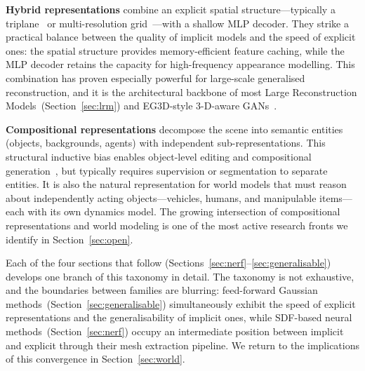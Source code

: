 \textbf{Hybrid representations} combine an explicit spatial structure---typically
a triplane~\citep{chan2022efficient} or multi-resolution
grid~\citep{muller2022instant}---with a shallow MLP decoder.
They strike a practical balance between the quality of implicit models and
the speed of explicit ones: the spatial structure provides memory-efficient
feature caching, while the MLP decoder retains the capacity for high-frequency
appearance modelling.
This combination has proven especially powerful for large-scale generalised
reconstruction, and it is the architectural backbone of most Large Reconstruction
Models~(Section~\ref{sec:lrm}) and EG3D-style 3-D-aware
GANs~\citep{chan2022efficient}.

\textbf{Compositional representations} decompose the scene into semantic
entities (objects, backgrounds, agents) with independent sub-representations.
This structural inductive bias enables object-level editing and compositional
generation~\citep{niemeyer2021giraffe,zhou2024gala3d}, but typically requires
supervision or segmentation to separate entities.
It is also the natural representation for world models that must reason about
independently acting objects---vehicles, humans, and manipulable items---each
with its own dynamics model.
The growing intersection of compositional representations and world modeling
is one of the most active research fronts we identify in Section~\ref{sec:open}.

\medskip
Each of the four sections that follow (Sections~\ref{sec:nerf}--\ref{sec:generalisable})
develops one branch of this taxonomy in detail.
The taxonomy is not exhaustive, and the boundaries between families are blurring:
feed-forward Gaussian methods~(Section~\ref{sec:generalisable}) simultaneously
exhibit the speed of explicit representations and the generalisability of
implicit ones, while SDF-based neural methods~(Section~\ref{sec:nerf}) occupy
an intermediate position between implicit and explicit through their mesh
extraction pipeline.
We return to the implications of this convergence in Section~\ref{sec:world}.


